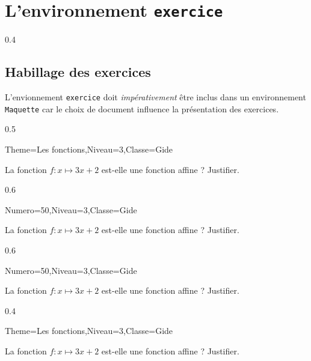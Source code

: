 \documentclass[12pt,french]{article}
\begin{document}
\section*{L'environnement \lstinline!exercice!}
\begin{Codes}{0.4}{}
\begin{exercice}
      
\end{exercice}
\end{Codes}
\subsection*{Habillage des exercices}
L'envionnement \lstinline!exercice! doit {\em impérativement} être inclus dans un environnement \lstinline!Maquette! car le choix de document influence la présentation des exercices.
\begin{Codes}[]{0.5}{}
\begin{Maquette}[IE]{Theme=Les fonctions,Niveau=3,Classe=Gide}
  \begin{exercice}
    La fonction $f:x\mapsto3x+2$ est-elle une fonction affine ? Justifier.
  \end{exercice}
\end{Maquette}
\end{Codes}
\begin{Codes}{0.6}{}
\begin{Maquette}[DM]{Numero=50,Niveau=3,Classe=Gide}
  \begin{exercice}
    La fonction $f:x\mapsto3x+2$ est-elle une fonction affine ? Justifier.
  \end{exercice}
\end{Maquette}
\end{Codes}
\begin{Codes}{0.6}{}
\begin{Maquette}[DS]{Numero=50,Niveau=3,Classe=Gide}
  \begin{exercice}
    La fonction $f:x\mapsto3x+2$ est-elle une fonction affine ? Justifier.
  \end{exercice}
\end{Maquette}
\end{Codes}
\begin{Codes}[]{0.4}{}
\begin{Maquette}[Fiche]{Theme=Les fonctions,Niveau=3,Classe=Gide}
  \begin{exercice}
    La fonction $f:x\mapsto3x+2$ est-elle une fonction affine ? Justifier.
  \end{exercice}
\end{Maquette}
\end{Codes}
\end{document}

